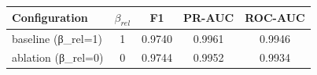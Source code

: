\begin{tabular}{lcccc}
\toprule
Configuration & $\beta_{rel}$ & F1 & PR-AUC & ROC-AUC \\
\midrule
baseline (β_rel=1) & 1 & 0.9740 & 0.9961 & 0.9946 \\
ablation (β_rel=0) & 0 & 0.9744 & 0.9952 & 0.9934 \\
\bottomrule
\end{tabular}
